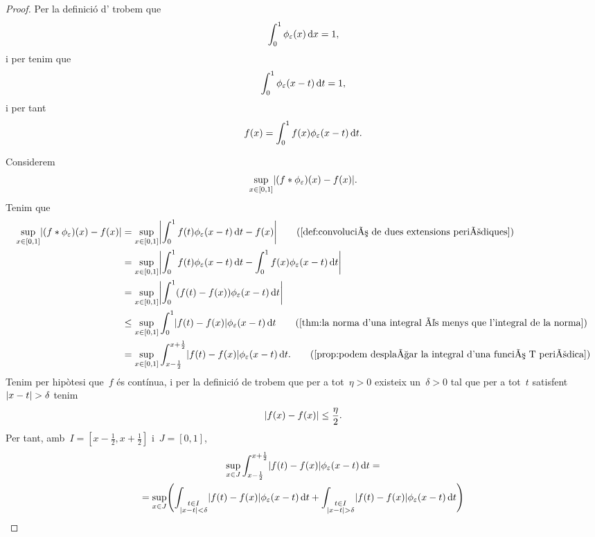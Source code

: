 \documentclass[../../main.tex]{subfiles}
\begin{document}
    \begin{proof}
        Per la definició d' trobem que
        \[
            \int_{0}^{1}\phi_{\varepsilon}(x)\mathop{}\!\mathrm{d} x=1,
        \]
        i per  tenim que
        \[
            \int_{0}^{1}\phi_{\varepsilon}(x-t)\mathop{}\!\mathrm{d} t=1,
        \]
        i per tant
        \[
            f(x)=\int_{0}^{1}f(x)\phi_{\varepsilon}(x-t)\mathop{}\!\mathrm{d} t.
        \]

        Considerem
        \[
            \sup_{x\in[0,1]}\abs{(f\convolucio\phi_{\varepsilon})(x)-f(x)}.
        \]
        Tenim que
        \begin{align*}
            \sup_{x\in[0,1]}\abs{(f\convolucio\phi_{\varepsilon})(x)-f(x)}&=\sup_{x\in[0,1]}\abs{\int_{0}^{1}f(t)\phi_{\varepsilon}(x-t)\diff t-f(x)} \tag{\ref{def:convolució de dues extensions periòdiques}} \\
            &=\sup_{x\in[0,1]}\abs{\int_{0}^{1}f(t)\phi_{\varepsilon}(x-t)\diff t-\int_{0}^{1}f(x)\phi_{\varepsilon}(x-t)\diff t} \\
            &=\sup_{x\in[0,1]}\abs{\int_{0}^{1}(f(t)-f(x))\phi_{\varepsilon}(x-t)\diff t} \\
            &\leq\sup_{x\in[0,1]}\int_{0}^{1}\abs{f(t)-f(x)}\phi_{\varepsilon}(x-t)\diff t \tag{\ref{thm:la norma d'una integral és menys que l'integral de la norma}} \\
            &=\sup_{x\in[0,1]}\int_{x-\frac{1}{2}}^{x+\frac{1}{2}}\abs{f(t)-f(x)}\phi_{\varepsilon}(x-t)\diff t.
            \tag{\ref{prop:podem desplaçar la integral d'una funció T periòdica}}
        \end{align*}
         Tenim per hipòtesi que~\(f\) és contínua, i per la definició de  trobem que per a tot~\(\eta>0\) existeix un~\(\delta>0\) tal que per a tot~\(t\) satisfent~\(\abs{x-t}>\delta\) tenim
         \[
             \abs{f(x)-f(x)}\leq\frac{\eta}{2}.
         \]
         Per tant, amb~\(I=[x-\frac{1}{2},x+\frac{1}{2}]\) i~\(J=[0,1]\), %
         \begin{multline*}
             \sup_{x\in J}\int_{x-\frac{1}{2}}^{x+\frac{1}{2}}\abs{f(t)-f(x)}\phi_{\varepsilon}(x-t)\diff t = \\
             =\sup_{x\in J}\left(\int_{\substack{t\in I\\\abs{x-t}<\delta}}\abs{f(t)-f(x)}\phi_{\varepsilon}(x-t)\diff t+\int_{\substack{t\in I\\\abs{x-t}>\delta}}\abs{f(t)-f(x)}\phi_{\varepsilon}(x-t)\diff t\right) \hfill\\

\end{multline*}
\end{proof}
\end{document}

